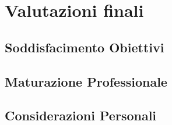 
\chapter{Valutazioni finali}
\label{cap:analisi-requisiti}
\section{Soddisfacimento Obiettivi}
\section{Maturazione Professionale}
\begin{comment}
conoscenza mondo enterprise \\
metodologia SCRUM \\
conoscenza teorica IaC \\
conoscenza teorica vari load test tool \\
competenze jmeter \\
competenze terraform \\
competenze aws \\
competenze puppet (+o-)\\
miglioramenti python \& bash
\end{comment}
\section{Considerazioni Personali}